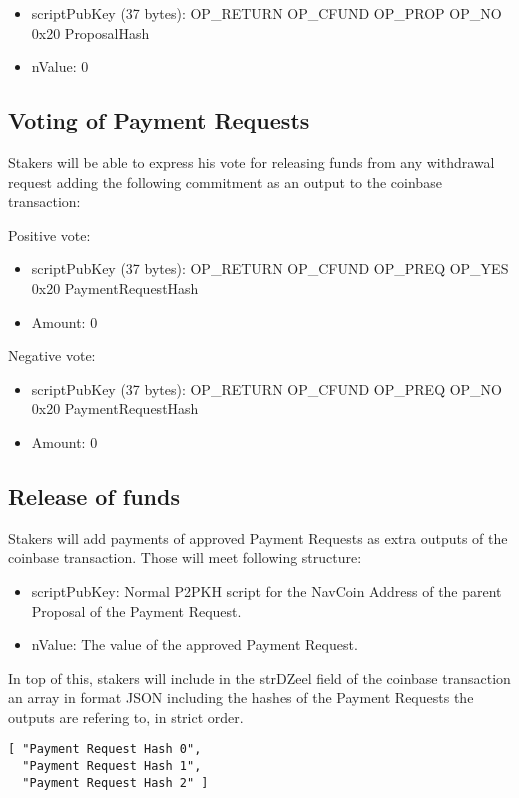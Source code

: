 \documentclass{artikel1}
\begin{document}
\begin{flushleft}
\begin{itemize}
\item scriptPubKey (37 bytes): OP\_RETURN OP\_CFUND OP\_PROP OP\_NO 0x20 ProposalHash
\item nValue: 0
\end{itemize}

\subsection{Voting of Payment Requests}
Stakers will be able to express his vote for releasing funds from any withdrawal request adding the following commitment as an output to the coinbase transaction:

Positive vote:
\begin{itemize}
\item scriptPubKey (37 bytes): OP\_RETURN OP\_CFUND OP\_PREQ OP\_YES 0x20 PaymentRequestHash
\item Amount: 0
\end{itemize}

Negative vote:
\begin{itemize}
\item scriptPubKey (37 bytes): OP\_RETURN OP\_CFUND OP\_PREQ OP\_NO 0x20 PaymentRequestHash
\item Amount: 0
\end{itemize}

\subsection{Release of funds}

Stakers will add payments of approved Payment Requests as extra outputs of the coinbase transaction. Those will meet following structure:

\begin{itemize}
	\item scriptPubKey: Normal P2PKH script for the NavCoin Address of the parent Proposal of the Payment Request.
	\item nValue: The value of the approved Payment Request.
\end{itemize}

In top of this, stakers will include in the strDZeel field of the coinbase transaction an array in format JSON including the hashes of the Payment Requests the outputs are refering to, in strict order.

\begin{lstlisting}
[ "Payment Request Hash 0",
  "Payment Request Hash 1",
  "Payment Request Hash 2" ]
\end{lstlisting}


\end{flushleft}
\end{document}

